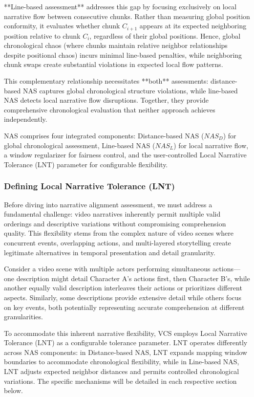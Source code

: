 \documentclass[main.tex]{subfiles}
\begin{document}
**Line-based assessment** addresses this gap by focusing exclusively on local narrative flow between consecutive chunks. Rather than measuring global position conformity, it evaluates whether chunk $C_{i+1}$ appears at its expected neighboring position relative to chunk $C_i$, regardless of their global positions. Hence, global chronological chaos (where chunks maintain relative neighbor relationships despite positional chaos) incurs minimal line-based penalties, while neighboring chunk swaps create substantial violations in expected local flow patterns.

This complementary relationship necessitates **both** assessments: distance-based NAS captures global chronological structure violations, while line-based NAS detects local narrative flow disruptions. Together, they provide comprehensive chronological evaluation that neither approach achieves independently.

NAS comprises four integrated components: Distance-based NAS ($NAS_D$) for global chronological assessment, Line-based NAS ($NAS_L$) for local narrative flow, a window regularizer for fairness control, and the user-controlled Local Narrative Tolerance (LNT) parameter for configurable flexibility.

\subsubsection{Defining Local Narrative Tolerance (LNT)}
Before diving into narrative alignment assessment, we must address a fundamental challenge: video narratives inherently permit multiple valid orderings and descriptive variations without compromising comprehension quality. This flexibility stems from the complex nature of video scenes where concurrent events, overlapping actions, and multi-layered storytelling create legitimate alternatives in temporal presentation and detail granularity.

Consider a video scene with multiple actors performing simultaneous actions—one description might detail Character A's actions first, then Character B's, while another equally valid description interleaves their actions or prioritizes different aspects. Similarly, some descriptions provide extensive detail while others focus on key events, both potentially representing accurate comprehension at different granularities.

To accommodate this inherent narrative flexibility, VCS employs Local Narrative Tolerance (LNT) as a configurable tolerance parameter. LNT operates differently across NAS components: in Distance-based NAS, LNT expands mapping window boundaries to accommodate chronological flexibility, while in Line-based NAS, LNT adjusts expected neighbor distances and permits controlled chronological variations. The specific mechanisms will be detailed in each respective section below.
\end{document}
